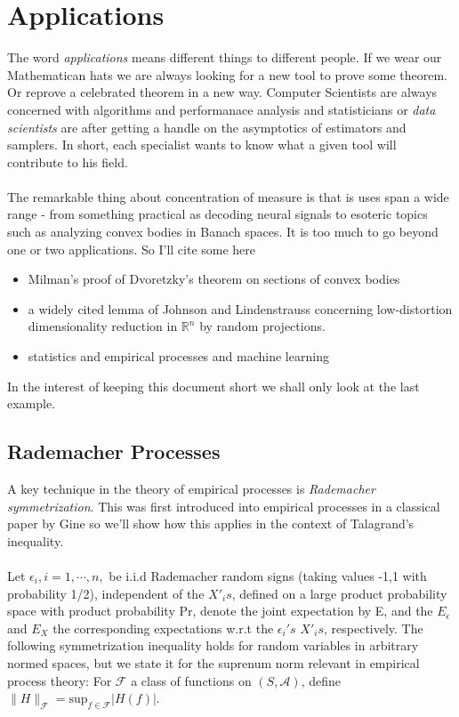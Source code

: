 \documentclass{article}
\theoremstyle{plain}
\begin{document}
\section{Applications}
The word \textit{applications} means different things to different people. If we wear our Mathematican hats we are always looking 
for a new tool to prove some theorem. Or reprove a celebrated theorem in a new way. Computer Scientists are always concerned with algorithms and performanace analysis and statisticians or \textit{data scientists} are after getting a handle on the asymptotics of estimators and samplers. In short, each specialist wants to know what a given tool will contribute to his field. 
\paragraph{} The remarkable thing about concentration of measure is that is uses span a wide range - from something practical as decoding neural signals to esoteric topics such as analyzing convex bodies in Banach spaces. 
It is too much to go beyond one or two applications.
So I'll cite some here 
\begin{itemize}
\item  Milman's proof of Dvoretzky's theorem on sections of convex bodies
\item a widely cited lemma of Johnson and Lindenstrauss concerning low-distortion dimensionality reduction in $\mathbb{R}^{n}$ by random projections.
\item statistics and empirical processes and machine learning\cite{BBL04b}
\end{itemize}
In the interest of keeping this document short we shall only look at the last example.
\subsection{Rademacher Processes}
A key technique in the theory of empirical processes is \textit{Rademacher symmetrization}. This was first introduced into empirical processes in a classical paper by Gine \cite{Gine1984}
so we'll show how this applies in the context of Talagrand's inequality. 
\paragraph{} Let $\epsilon_i,i=1,\cdots,n,$ be i.i.d Rademacher random signs (taking values -1,1 with probability 1/2), independent of the $X'_{i}s$, defined on a large product probability space with product probability Pr, denote the joint expectation by E, and the $E_{\epsilon}$ and $E_{X}$ the corresponding expectations w.r.t the $\epsilon_i 's$ $X'_{i}s$,
respectively. The following symmetrization inequality holds for random variables in arbitrary normed spaces, but we state it for the suprenum norm relevant in empirical process theory: For $\mathcal{F}$ a class of functions on $(S,\mathcal{A})$, define $\|
H\|_{\mathcal{F}} = \mathrm{sup}_{f \in \mathcal{F}} |H(f)|$.
\end{document}
